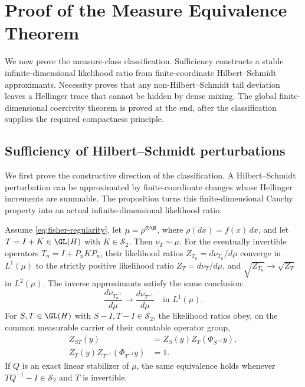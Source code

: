 \section{Proof of the Measure Equivalence Theorem}
\label{sec:proof-of-the-measure-equivalence-theorem}

We now prove the measure-class classification.
Sufficiency constructs a stable infinite-dimensional likelihood ratio from
finite-coordinate Hilbert--Schmidt approximants.
Necessity proves that any non-Hilbert--Schmidt tail deviation leaves a
Hellinger trace that cannot be hidden by dense mixing.
The global finite-dimensional coercivity theorem is proved at the end,
after the classification supplies the required compactness principle.

\subsection{Sufficiency of Hilbert--Schmidt perturbations}
\label{sec:sufficiency}

We first prove the constructive direction of the classification.
A Hilbert--Schmidt perturbation can be approximated by finite-coordinate
changes whose Hellinger increments are summable.
The proposition turns this finite-dimensional Cauchy property into an actual
infinite-dimensional likelihood ratio.

\begin{proposition}
\label{prop:hilbert-schmidt-sufficiency}
Assume \eqref{eq:fisher-regularity}, let
$\mu=\rho^{\otimes\N}$, where $\rho(dx)=f(x)\,dx$, and let
$T=I+K\in\GL(H)$ with $K\in\mathcal S_2$.
Then \(\nu_T\sim\mu\).
For the eventually invertible operators
$T_n=I+P_nKP_n$, their likelihood ratios
$Z_{T_n}=d\nu_{T_n}/d\mu$ converge in $L^1(\mu)$ to the strictly
positive likelihood ratio $Z_T=d\nu_T/d\mu$, and
$\sqrt{Z_{T_n}}\to\sqrt{Z_T}$ in $L^2(\mu)$.
The inverse approximants satisfy the same conclusion:
\[
 \frac{d\nu_{T_n^{-1}}}{d\mu}
 \longrightarrow\frac{d\nu_{T^{-1}}}{d\mu}
 \quad\text{in }L^1(\mu).
\]
For $S,T\in\GL(H)$ with $S-I,T-I\in\mathcal S_2$, the
likelihood ratios obey, on the common measurable carrier of their countable
operator group,
\begin{align}
 Z_{ST}(y)&=Z_S(y)Z_T(\Phi_{S^{-1}}y),
   \label{eq:rn-cocycle}\\
 Z_T(y)Z_{T^{-1}}(\Phi_{T^{-1}}y)&=1.
   \label{eq:rn-inverse}
\end{align}
If $Q$ is an exact linear stabilizer of $\mu$, the same equivalence
holds whenever \(TQ^{-1}-I\in\mathcal S_2\) and \(T\) is invertible.
\end{proposition}

